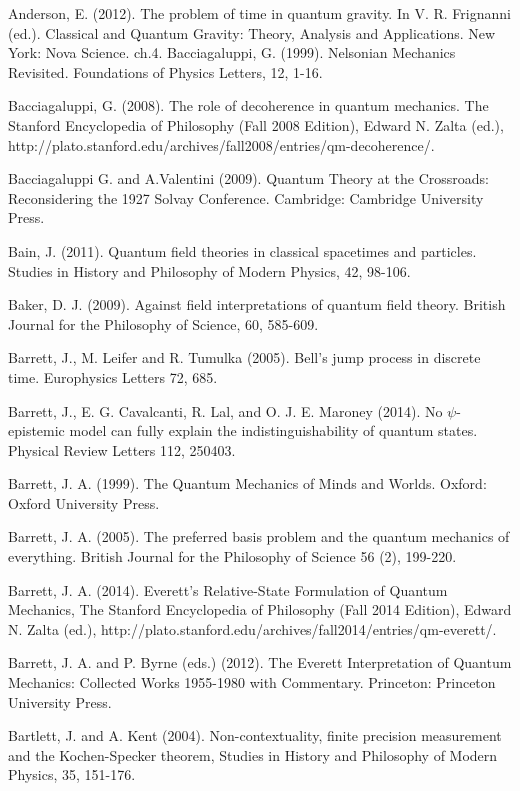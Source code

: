 \begin{thebibliography}{}
\bibitem{} Anderson, E. (2012). The problem of time in quantum gravity. In V. R. Frignanni (ed.). Classical and Quantum Gravity: Theory, Analysis and Applications. New York: Nova Science. ch.4.
\bibitem{}  Bacciagaluppi, G. (1999). Nelsonian Mechanics Revisited. Foundations of Physics Letters, 12, 1-16.

\bibitem{} Bacciagaluppi, G. (2008). The role of decoherence in quantum mechanics. The Stanford Encyclopedia of Philosophy (Fall 2008 Edition), Edward N. Zalta (ed.), http://plato.stanford.edu/archives/fall2008/entries/qm-decoherence/. 

\bibitem{} Bacciagaluppi G. and A.Valentini  (2009). Quantum Theory at the Crossroads: Reconsidering the 1927 Solvay Conference. Cambridge: Cambridge University Press.

\bibitem{} Bain, J. (2011). Quantum field theories in classical spacetimes and particles. Studies in History and Philosophy of Modern Physics, 42, 98-106.

\bibitem{} Baker, D. J. (2009). Against field interpretations of quantum field theory. British Journal for the Philosophy of Science, 60, 585-609.


\bibitem{} Barrett, J., M. Leifer and R. Tumulka (2005). Bell’s jump process in discrete time. Europhysics Letters 72, 685.

\bibitem{} Barrett, J.,  E. G. Cavalcanti, R. Lal, and O. J. E. Maroney (2014). No $\psi$-epistemic model can fully explain the indistinguishability of quantum states. Physical Review Letters 112, 250403.

\bibitem{} Barrett, J. A. (1999). The Quantum Mechanics of Minds and Worlds. Oxford: Oxford University Press.

\bibitem{} Barrett, J. A. (2005). The preferred basis problem and the quantum mechanics of everything. British Journal for the Philosophy of Science 56 (2), 199-220.

\bibitem{} Barrett, J. A. (2014). Everett's Relative-State Formulation of Quantum Mechanics, The Stanford Encyclopedia of Philosophy (Fall 2014 Edition), Edward N. Zalta (ed.), http://plato.stanford.edu/archives/fall2014/entries/qm-everett/.

\bibitem{} Barrett, J. A. and P. Byrne (eds.) (2012). The Everett Interpretation of Quantum Mechanics: Collected Works 1955-1980 with Commentary. Princeton: Princeton University Press.

\bibitem{} Bartlett, J. and A. Kent (2004). Non-contextuality, finite precision measurement and the Kochen-Specker theorem, Studies in History and Philosophy of Modern Physics, 35, 151-176.


\end{thebibliography}
